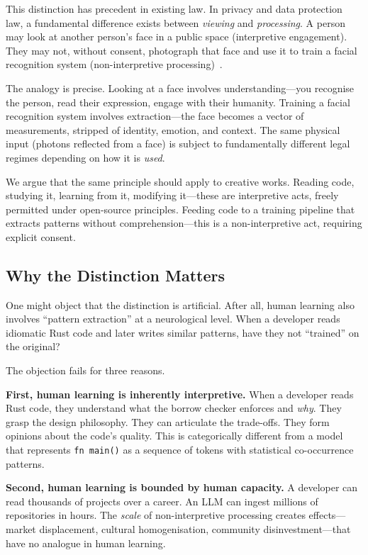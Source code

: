 \documentclass[11pt,twocolumn]{article}
\begin{document}
This distinction has precedent in existing law. In privacy and data
protection law, a fundamental difference exists between \emph{viewing}
and \emph{processing}. A person may look at another person's face in a
public space (interpretive engagement). They may not, without consent,
photograph that face and use it to train a facial recognition system
(non-interpretive processing)~\cite{gdpr2016}.

The analogy is precise. Looking at a face involves understanding---you
recognise the person, read their expression, engage with their humanity.
Training a facial recognition system involves extraction---the face
becomes a vector of measurements, stripped of identity, emotion, and
context. The same physical input (photons reflected from a face) is
subject to fundamentally different legal regimes depending on how it is
\emph{used}.

We argue that the same principle should apply to creative works. Reading
code, studying it, learning from it, modifying it---these are
interpretive acts, freely permitted under open-source principles.
Feeding code to a training pipeline that extracts patterns without
comprehension---this is a non-interpretive act, requiring explicit
consent.

\subsection{Why the Distinction Matters}

One might object that the distinction is artificial. After all, human
learning also involves ``pattern extraction'' at a neurological level.
When a developer reads idiomatic Rust code and later writes similar
patterns, have they not ``trained'' on the original?

The objection fails for three reasons.

\textbf{First, human learning is inherently interpretive.} When a
developer reads Rust code, they understand what the borrow checker
enforces and \emph{why}. They grasp the design philosophy. They can
articulate the trade-offs. They form opinions about the code's quality.
This is categorically different from a model that represents
\texttt{fn main()} as a sequence of tokens with statistical
co-occurrence patterns.

\textbf{Second, human learning is bounded by human capacity.} A
developer can read thousands of projects over a career. An LLM can
ingest millions of repositories in hours. The \emph{scale} of
non-interpretive processing creates effects---market displacement,
cultural homogenisation, community disinvestment---that have no analogue
in human learning.
\end{document}
